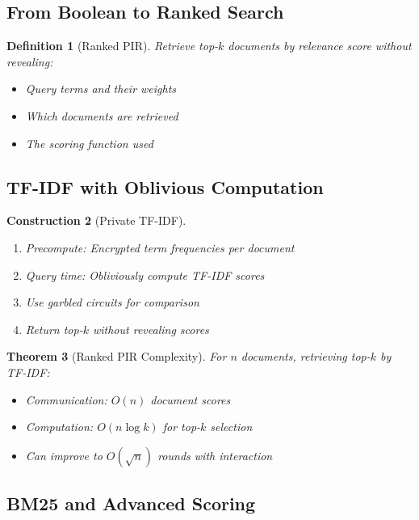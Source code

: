 \documentclass[11pt,final,hidelinks]{article}
\newtheorem{theorem}{Theorem}[section]
\newtheorem{definition}[theorem]{Definition}
\newtheorem{construction}[theorem]{Construction}
\begin{document}
\subsection{From Boolean to Ranked Search}

\begin{definition}[Ranked PIR]
Retrieve top-$k$ documents by relevance score without revealing:
\begin{itemize}
    \item Query terms and their weights
    \item Which documents are retrieved
    \item The scoring function used
\end{itemize}
\end{definition}

\subsection{TF-IDF with Oblivious Computation}

\begin{construction}[Private TF-IDF]
\begin{enumerate}
    \item Precompute: Encrypted term frequencies per document
    \item Query time: Obliviously compute TF-IDF scores
    \item Use garbled circuits for comparison
    \item Return top-$k$ without revealing scores
\end{enumerate}
\end{construction}

\begin{theorem}[Ranked PIR Complexity]
For $n$ documents, retrieving top-$k$ by TF-IDF:
\begin{itemize}
    \item Communication: $O(n)$ document scores
    \item Computation: $O(n \log k)$ for top-$k$ selection
    \item Can improve to $O(\sqrt{n})$ rounds with interaction
\end{itemize}
\end{theorem}

\subsection{BM25 and Advanced Scoring}
\end{document}
